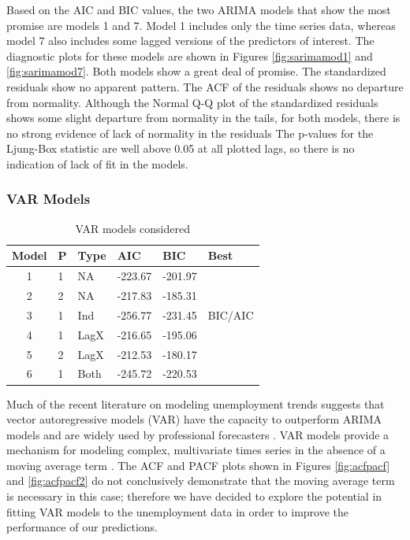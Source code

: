 \documentclass[twoside,twocolumn]{article}
\begin{document}
		Based on the AIC and BIC values, the two ARIMA models that show the most promise are models 1 and 7.  Model 1 includes only the time series data, whereas model 7 also includes some lagged versions of the predictors of interest.  The diagnostic plots for these models are shown in Figures \ref{fig:sarimamod1} and \ref{fig:sarimamod7}. Both models show a great deal of promise.  The standardized residuals show no apparent pattern. The ACF of the residuals shows no departure from normality. Although the Normal Q-Q plot of the standardized residuals shows some slight departure from normality in the tails, for both models, there is no strong evidence of lack of normality in the residuals  The p-values for the  Ljung-Box statistic are well above 0.05 at all plotted lags, so there is no indication of lack of fit in the models.


      \subsubsection{VAR Models}
\begin{table}[htb]
\centering
\caption{VAR models considered}
\label{tab:varchoices}
\begin{tabular}{clllll}
  \hline
 Model & P & Type &  AIC & BIC & Best \\
  \hline
1  & 1 & NA  &  -223.67 & -201.97 &  \\
  2  & 2 & NA  &   -217.83 & -185.31 &  \\
  3  & 1 & Ind  & -256.77 & -231.45 & BIC/AIC \\
  4  & 1 & LagX & -216.65 & -195.06 &  \\
  5  & 2 & LagX & -212.53 & -180.17 &  \\
  6  & 1 & Both  & -245.72 & -220.53 &  \\
   \hline
\end{tabular}
\end{table}



     Much of the recent literature on modeling unemployment trends suggests that vector autoregressive models (VAR) have the capacity to outperform ARIMA models and are widely used by professional forecasters \citep{Meyer2015, Tasci2015, Barnichon2016}. VAR models provide a mechanism for modeling complex, multivariate times series in the absence of a moving average term \citep{Chatfield2001} . The ACF and PACF plots shown in Figures \ref{fig:acfpacf} and \ref{fig:acfpacf2} do not conclusively demonstrate that the moving average term is necessary in this case; therefore we have decided to explore the potential in fitting VAR models to the unemployment data in order to improve the performance of our predictions.
\end{document}
